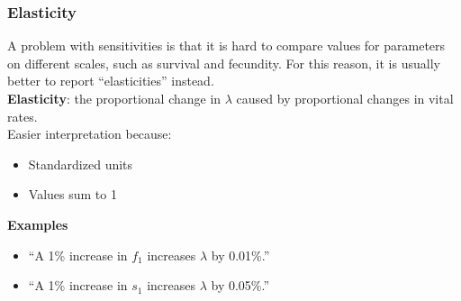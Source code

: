 \documentclass[color=usenames,dvipsnames]{beamer}\usepackage[]{graphicx}\usepackage[]{color}
\begin{document}
\begin{frame}
  \frametitle{Elasticity}
  A problem with sensitivities is that it is hard to compare values
  for parameters on different scales, such as survival and
  fecundity. For this reason, it is usually better to report
  ``elasticities'' instead. \\
  \pause
  \vfill
  {\bf Elasticity}: the proportional change in $\lambda$ caused by
  proportional changes in vital rates. \\
  \pause
  \vfill
   Easier interpretation because: %
   \begin{itemize}
     \item Standardized units
     \item Values sum to 1
   \end{itemize}
   \pause
   \vfill
   {\bf Examples}
  \begin{itemize}
    \item[] ``A 1\% increase in $f_1$ increases $\lambda$ by 0.01\%.''
    \item[] ``A 1\% increase in $s_1$ increases $\lambda$ by 0.05\%.''
  \end{itemize}

\end{frame}
\end{document}
